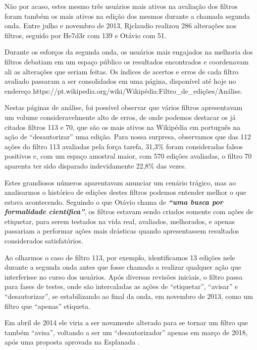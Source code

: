 Não por acaso, estes mesmo três usuários mais ativos na avaliação dos filtros foram também os mais ativos na edição dos mesmos durante a chamada segunda onda. Entre julho e novembro de 2013, Rjclaudio realizou 286 alterações nos filtros, seguido por He7d3r com 139 e Otávio com 51.

Durante os esforços da segunda onda, os usuários mais engajados na melhoria dos filtros debatiam em um espaço público os resultados encontrados e coordenavam ali as alterações que seriam feitas. Os índices de acertos e erros de cada filtro avaliado passaram a ser consolidados em uma página, disponível até hoje no endereço https://pt.wikipedia.org/wiki/Wikipédia:Filtro\_de\_edições/Análise. 

Nestas páginas de análise, foi possível observar que vários filtros apresentavam um volume consideravelmente alto de erros, de onde podemos destacar os já citados filtros 113 e 70, que são os mais ativos na Wikipédia em português na ação de ``desautorizar'' uma edição. Para nossa surpresa, observamos que das 112 ações do filtro 113 avaliadas pela força tarefa, 31,3\% foram consideradas falsos positivos e, com um espaço amostral maior, com 570 edições avaliadas, o filtro 70 aparenta ter sido disparado indevidamente 22,8\% das vezes.

Estes grandiosos números aparentavam anunciar um cenário trágico, mas ao analisarmos o histórico de edições destes filtros podemos entender melhor o que estava acontecendo. Seguindo o que Otávio chama de \textbf{\textit{``uma busca por formalidade científica''}}, os filtros estavam sendo criados somente com ações de etiquetar, para serem testados na vida real, avaliados, melhorados, e apenas passariam a performar ações mais drásticas quando apresentassem resultados considerados satisfatórios.

Ao olharmos o caso de filtro 113, por exemplo, identificamos 13 edições nele durante a segunda onda antes que fosse chamado a realizar qualquer ação que interferisse no curso dos usuários. Após diversas revisões iniciais, o filtro passa para fases de testes, onde são intercaladas as ações de “etiquetar”, “avisar” e “desautorizar”, se estabilizando ao final da onda, em novembro de 2013, como um filtro que “apenas” etiqueta.

Em abril de 2014 ele viria a ser novamente alterado para se tornar um filtro que também “avisa”, voltando a ser um “desautorizador” apenas em março de 2018, após uma proposta aprovada na Esplanada .

